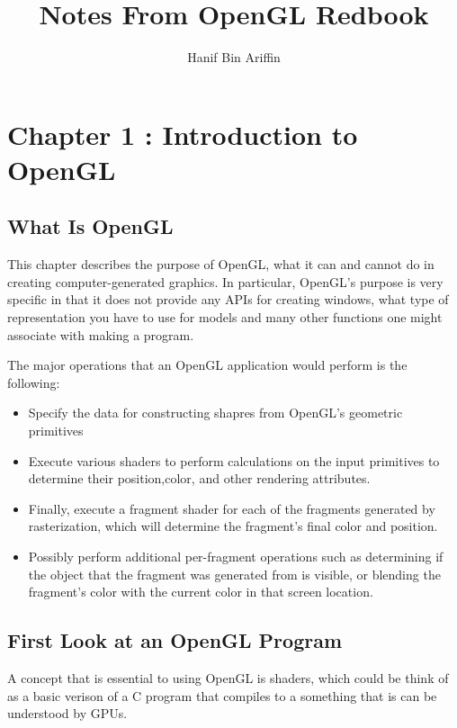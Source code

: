 \documentclass[a4paper, 12pt]{article}
\title{Notes From OpenGL Redbook}
\author{Hanif Bin Ariffin}
\begin{document}
\maketitle
\tableofcontents

\newpage
\section{Chapter 1 : Introduction to OpenGL}

\subsection{What Is OpenGL}

This chapter describes the purpose of OpenGL, what it can and cannot do in creating computer-generated graphics.
In particular, OpenGL's purpose is very specific in that it does not provide any APIs for creating windows, what type of representation you have to use for models and many other functions one might associate with making a program.

The major operations that an OpenGL application would perform is the following:

\begin{itemize}
      \item Specify the data for constructing shapres from OpenGL's geometric primitives
      \item Execute various shaders to perform calculations on the input primitives to determine their position,color, and other rendering attributes.
      \item Finally, execute a fragment shader for each of the fragments generated by rasterization, which will determine the fragment's final color and position.
      \item Possibly perform additional per-fragment operations such as determining if the object that the fragment was generated from is visible, or blending the fragment's color with the current color in that screen location.
\end{itemize}

\subsection{First Look at an OpenGL Program}

A concept that is essential to using OpenGL is shaders, which could be think of as a basic verison of a C program that compiles to a something that is can be understood by GPUs.
\end{document}
